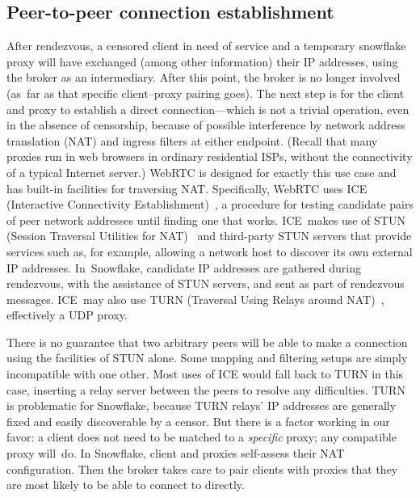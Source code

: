 \documentclass[letterpaper,twocolumn]{article}
\begin{document}
\subsection{Peer-to-peer connection establishment}
\label{sec:ice}

After rendezvous,
a censored client in need of service
and a temporary snowflake proxy
will have exchanged
(among other information)
their IP addresses,
using the broker as an intermediary.
After this point, the broker is no longer involved
(as~far as that specific client--proxy pairing goes).
The next step is for the client and proxy
to establish a direct connection---which
is not a trivial operation,
even in the absence of censorship,
because of possible interference by
network address translation (NAT)
and ingress filters at either endpoint.
(Recall that many proxies run in web browsers
in ordinary residential ISPs,
without the connectivity of a typical Internet server.)
WebRTC is designed for exactly this use case
and has built-in facilities for traversing NAT.
Specifically, WebRTC uses
ICE (Interactive Connectivity Establishment)~\cite{rfc8445},
a procedure for testing candidate pairs of peer network addresses
until finding one that works.
ICE~makes use of
STUN (Session Traversal Utilities for NAT)~\cite{rfc8489}
and third-party STUN servers that provide services such as,
for example, allowing a network host to
discover its own external IP addresses.
In~Snowflake, candidate IP addresses are gathered
during rendezvous, with the assistance of STUN servers,
and sent as part of rendezvous messages.
ICE~may also use
TURN (Traversal Using Relays around NAT)~\cite{rfc8656},
effectively a UDP proxy.

There is no guarantee that two arbitrary peers will be able to make
a connection using the facilities of STUN alone.
Some mapping and
filtering setups are simply incompatible with one other.
Most uses of ICE would fall back to TURN in this case,
inserting a relay server between the peers to resolve any difficulties.
TURN is problematic for Snowflake,
because TURN relays' IP addresses are
generally fixed and easily discoverable by a censor.
But there is a factor working in our favor:
a client does not need to be matched to a \emph{specific} proxy;
any compatible proxy will~do.
In Snowflake, client and proxies self-assess their NAT configuration.
Then the broker takes care to pair clients
with proxies that they are most likely to be able to connect to directly.
\end{document}
